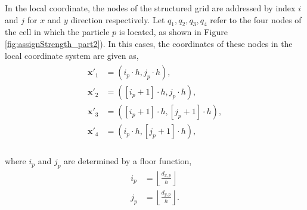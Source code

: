 \begin{enumerate}[label=4.\alph*)]
	In the local coordinate, the nodes of the structured grid are addressed by index $i$ and $j$ for $x$ and $y$ direction respectively. Let $q_1,q_2,q_3,q_4$ refer to the four nodes of the cell in which the particle $p$ is located, as shown in Figure \ref{fig:assignStrength_part2}). In this cases, the coordinates of these nodes in the local coordinate system are given as,
%	
%	
%	
			\begin{eqnarray}
			\begin{aligned}
			\mathbf{x}'_1 &= (i_p \cdot h, j_p \cdot h),\\
			\mathbf{x}'_2 &= \left([i_p+1]\cdot h, j_p \cdot h\right),\\
			\mathbf{x}'_3 &= ([i_p+1]\cdot h, [j_p+1] \cdot h),\\
			\mathbf{x}'_4 &= (i_p \cdot h, [j_p+1] \cdot h),\\
			\end{aligned}
			\label{eq:wip}
			\end{eqnarray}
	
	where $i_p$ and $j_p$ are determined by a floor function,
		\begin{subequations}
			\begin{align}
			i_p &= \left\lfloor\frac{d_{x,p}}{h}\right\rfloor\\
			j_p &= \left\lfloor\frac{d_{y,p}}{h}\right\rfloor.
			\end{align}
			\label{eq:floorindex}
		\end{subequations}
	

\end{enumerate}
